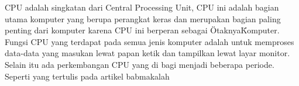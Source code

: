 	
CPU adalah singkatan dari Central Processing Unit, CPU ini adalah bagian utama komputer yang berupa perangkat keras dan merupakan bagian paling penting dari komputer karena CPU ini berperan sebagai \"Otaknya\" Komputer. Fungsi CPU yang terdapat pada semua jenis komputer adalah untuk memproses data-data yang masukan lewat papan ketik dan tampilkan lewat layar monitor. Selain itu ada perkembangan CPU yang di bagi menjadi beberapa periode. Seperti yang tertulis pada artikel babmakalah \cite{babmakalah}
